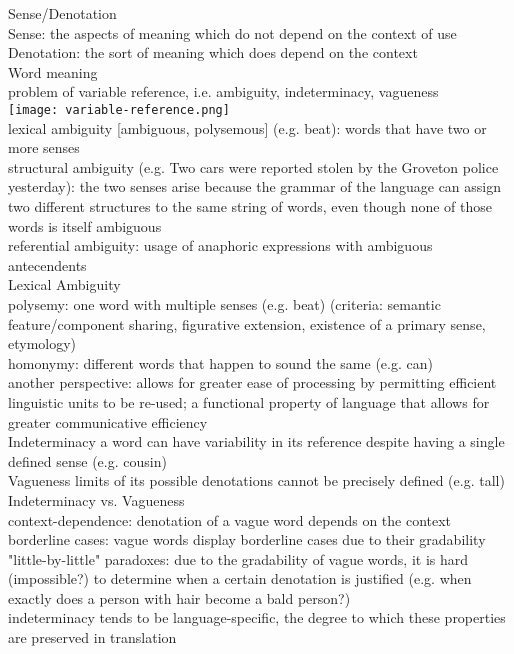 \scriptsize{Sense/Denotation}\\ {\tiny Sense: the aspects of meaning which do not depend on the context of use\\
Denotation: the sort of meaning which does depend on the context
}\\
\scriptsize{Word meaning}\\ {\tiny problem of variable reference, i.e. ambiguity, indeterminacy, vagueness\\
\texttt{[image: variable-reference.png]}\\
lexical ambiguity [ambiguous, polysemous] (e.g. beat): words that have two or more senses\\
structural ambiguity (e.g. Two cars were reported stolen by the Groveton police yesterday): the two senses arise because the grammar of the language can assign two different structures to the same string of words, even though none of those words is itself ambiguous\\
referential ambiguity: usage of anaphoric expressions with ambiguous antecendents
}\\
\scriptsize{Lexical Ambiguity}\\ {\tiny polysemy: one word with multiple senses (e.g. beat) (criteria: semantic feature/component sharing, figurative extension, existence of a primary sense, etymology)\\
homonymy: different words that happen to sound the same (e.g. can)\\
another perspective: allows for greater ease of processing by permitting efficient linguistic units to be re-used; a functional property of language that allows for greater communicative efficiency
}\\
\scriptsize{Indeterminacy} {\tiny a word can have variability in its reference despite having a single defined sense (e.g. cousin) 
}\\
\scriptsize{Vagueness} {\tiny limits of its possible denotations cannot be precisely defined (e.g. tall)
}\\
\scriptsize{Indeterminacy vs. Vagueness}\\ {\tiny context-dependence: denotation of a vague word depends on the context\\
borderline cases: vague words display borderline cases due to their gradability\\
"little-by-little" paradoxes: due to the gradability of vague words, it is hard (impossible?) to determine when a certain denotation is justified (e.g. when exactly does a person with hair become a bald person?)\\
indeterminacy tends to be language-specific, the degree to which these properties are preserved in translation
}\\
